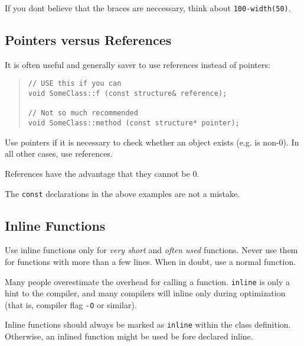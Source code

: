 \noindent If you dont believe that the braces are neccessary, think
about \mbox{\texttt{100-width(50)}}.



%
%

\subsection{Pointers versus References}

It is often useful and generally saver to use references instead of
pointers:

\begin{quote}
\begin{verbatim}
// USE this if you can
void SomeClass::f (const structure& reference);

// Not so much recommended
void SomeClass::method (const structure* pointer);
\end{verbatim}
\end{quote}

\begin{notes} 
  \item
  Use pointers if it is necessary to check whether an object
  exists (e.g. is non-0). In all other cases, use references.

  \item
  References have the advantage that they cannot be 0.

  \item
  The \texttt{const} declarations in the above examples are not a
  mistake.
\end{notes}




%
%

\subsection{Inline Functions}

Use inline functions only for \emph{very short} and \emph{often used} 
functions.  Never use them for functions with more than a few lines.  
When in doubt, use a normal function.

\begin{notes}
  \item
  Many people overestimate the overhead for calling a function.
  \texttt{inline} is only a hint to the compiler, and many
  compilers will inline only during optimization (that is,
  compiler flag \texttt{-O} or similar).

  \item
  Inline functions should always be marked as \texttt{inline}
  within the class definition. Otherwise, an inlined function
  might be used be fore declared inline.
\end{notes}



